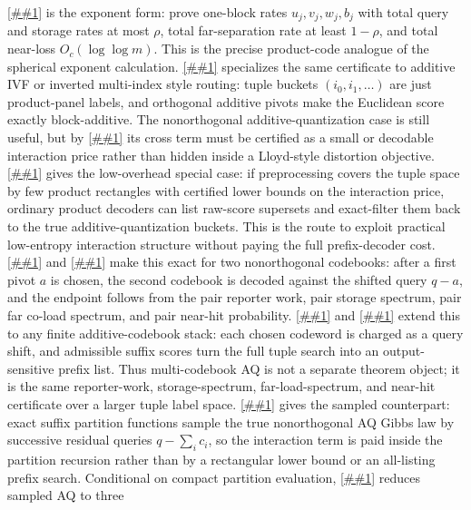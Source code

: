 \documentclass[10pt]{article}
\newcommand{\cref}[1]{\ref{##1}}
\newcommand{\Cref}[1]{\ref{##1}}
\theoremstyle{definition}
\begin{document}
\Cref{cor:product-panel-rate-bookkeeping} is the exponent form: prove one-block
rates \(u_j,v_j,w_j,b_j\) with total query and storage rates at most \(\rho\),
total far-separation rate at least \(1-\rho\), and total near-loss
\(O_c(\log\log m)\).  This is the precise product-code analogue of the
spherical exponent calculation.
\Cref{cor:additive-ivf-product-panel} specializes the same certificate to
additive IVF or inverted multi-index style routing: tuple buckets
\((i_0,i_1,\ldots)\) are just product-panel labels, and orthogonal additive
pivots make the Euclidean score exactly block-additive.  The nonorthogonal
additive-quantization case is still useful, but by
\cref{rem:nonorthogonal-additive-ivf} its cross term must be certified as a
small or decodable interaction price rather than hidden inside a Lloyd-style
distortion objective.
\Cref{prop:rectangular-interaction-cover-aq} gives the low-overhead special
case: if preprocessing covers the tuple space by few product rectangles with
certified lower bounds on the interaction price, ordinary product decoders can
list raw-score supersets and exact-filter them back to the true
additive-quantization buckets.  This is the route to exploit practical
low-entropy interaction structure without paying the full prefix-decoder cost.
\Cref{lem:priced-pair-additive-ivf-reporter} and
\cref{prop:priced-pair-additive-ivf-compiler} make this exact for two
nonorthogonal codebooks: after a first pivot \(a\) is chosen, the second
codebook is decoded against the shifted query \(q-a\), and the endpoint follows
from the pair reporter work, pair storage spectrum, pair far co-load spectrum,
and pair near-hit probability.
\Cref{lem:priced-prefix-additive-ivf-reporter} and
\cref{prop:priced-prefix-additive-ivf-compiler} extend this to any finite
additive-codebook stack: each chosen codeword is charged as a query shift, and
admissible suffix scores turn the full tuple search into an output-sensitive
prefix list.  Thus multi-codebook AQ is not a separate theorem object; it is
the same reporter-work, storage-spectrum, far-load-spectrum, and near-hit
certificate over a larger tuple label space.
\Cref{lem:gibbs-prefix-additive-ivf-sampler} gives the sampled counterpart:
exact suffix partition functions sample the true nonorthogonal AQ Gibbs law by
successive residual queries \(q-\sum_i c_i\), so the interaction term is paid
inside the partition recursion rather than by a rectangular lower bound or an
all-listing prefix search.  Conditional on compact partition evaluation,
\cref{prop:gibbs-sampled-additive-ivf-compiler} reduces sampled AQ to three
\end{document}
